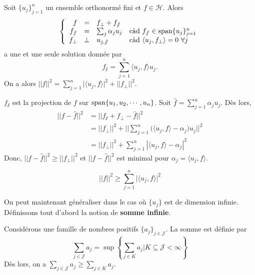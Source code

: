\begin{lemme}
\label{lemme:Bessel}
    Soit $\{u_j\}_{j=1}^n$ un ensemble orthonormé fini et $f\in\mathcal{H}$. Alors
    \begin{equation*}
        \left\{ \begin{array}{rcll}
            f & = & f_\bot + f_\sslash  \\
            f_\sslash & = & \sum_{j} \alpha_j u_j & \mathrm{c\Grave{a}d}\ f_\sslash\in\setSpan\{u_j\}_{j=1}^n \\
            f_\bot & \bot & u_{j,\sslash} & \mathrm{c\Grave{a}d}\ \langle u_j,f_\bot \rangle = 0\ \forall j
        \end{array} \right.
    \end{equation*}
    a une et une seule solution donnée par
    \begin{equation*}
        f_\sslash = \sum_{j=1}^n \langle u_j,f \rangle u_j.
    \end{equation*}
    On a alors $||f||^2 = \sum_{j=1}^n \big|\langle u_j,f \rangle\big|^2 + ||f_\bot||^2$.
    
    $f_\sslash$ est la projection de $f$ sur $\operatorname{span}\{ u_1,u_2,\cdots,u_n \}$. Soit $\hat{f}= \sum \limits_{j=1}^n\alpha_ju_j$. Dès lors,
    \begin{align*}
        ||f-\hat{f}||^2 &= ||f_\sslash + f_\bot -\hat{f}||^2 \\
        &= ||f_\bot||^2 + ||\sum \limits_{j=1}^n \big( \langle u_j,f\rangle - \alpha_j\big)u_j||^2\\
        &= ||f_\bot||^2 + \sum \limits_{j=1}^n|\langle u_j,f\rangle -\alpha_j|^2
    \end{align*}
    Donc, $||f-\hat{f}||^2 \geq ||f_\bot||^2$ et $||f-\hat{f}||^2$ est minimal pour $\alpha_j=\langle u_j,f \rangle$.
\end{lemme}

\begin{theo}
    \begin{equation*}
        ||f||^2 \geq \sum_{j=1}^n \big|\langle u_j,f \rangle\big|^2
    \end{equation*}
\end{theo}

On peut maintenant généraliser dans le cas où $\{u_j\}$ est de dimension infinie. Définissons tout d'abord la notion de \textbf{somme infinie}.

\begin{definition}
    Considérons une famille de nombres positifs $\{a_j\}_{j\in\mathcal{J}}$. La somme est définie par
    \begin{equation*}
        \sum_{j\in\mathcal{J}} a_j = \sup\left\{\sum_{j\in K} a_j\big| K\subseteq \mathcal{J} < \infty\right\}
    \end{equation*}
    Dès lors, on a $\sum_{j\in\mathcal{J}} a_j \geq \sum_{j\in K} a_j$.
\end{definition}

